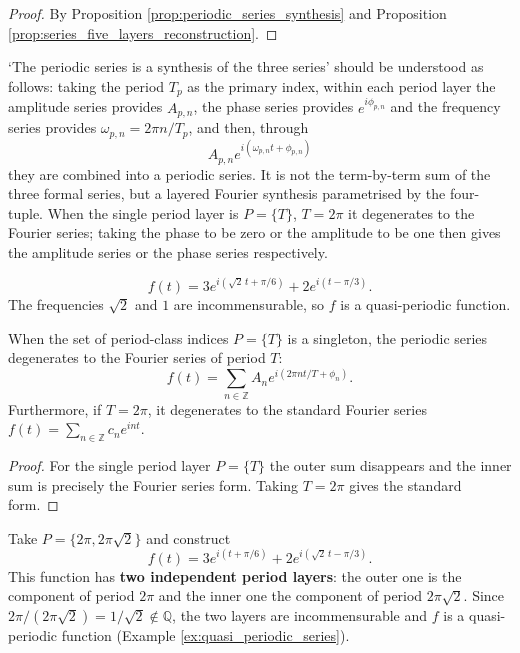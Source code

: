 \begin{proof}
By Proposition \ref{prop:periodic_series_synthesis} and Proposition \ref{prop:series_five_layers_reconstruction}.
\end{proof}

\begin{remark}\label{rem:periodic_series_synthesis_scope}
`The periodic series is a synthesis of the three series' should be understood as follows: taking the period $T_p$ as the primary index, within each period layer the amplitude series provides $A_{p,n}$, the phase series provides $e^{i\phi_{p,n}}$ and the frequency series provides $\omega_{p,n}=2\pi n/T_p$, and then, through
\[
A_{p,n}e^{i(\omega_{p,n}t+\phi_{p,n})}
\]
they are combined into a periodic series. It is not the term-by-term sum of the three formal series, but a layered Fourier synthesis parametrised by the four-tuple. When the single period layer is $P=\{T\}$, $T=2\pi$ it degenerates to the Fourier series; taking the phase to be zero or the amplitude to be one then gives the amplitude series or the phase series respectively.
\end{remark}

\begin{example}\label{ex:quasi_periodic_series}
\[
f(t) = 3 e^{i(\sqrt{2}\,t + \pi/6)} + 2 e^{i(t - \pi/3)}.
\]
The frequencies $\sqrt{2}$ and $1$ are incommensurable, so $f$ is a quasi-periodic function.
\end{example}

\begin{property}\label{prop:periodic_series_degeneration}
When the set of period-class indices $P = \{T\}$ is a singleton, the periodic series degenerates to the Fourier series of period $T$:
\[
f(t) = \sum_{n \in \mathbb{Z}} A_n e^{i(2\pi n t / T + \phi_n)}.
\]
Furthermore, if $T = 2\pi$, it degenerates to the standard Fourier series $f(t) = \sum_{n \in \mathbb{Z}} c_n e^{int}$.
\end{property}

\begin{proof}
For the single period layer $P = \{T\}$ the outer sum disappears and the inner sum is precisely the Fourier series form. Taking $T = 2\pi$ gives the standard form.
\end{proof}

\begin{example}\label{ex:two_period_layers}
Take $P = \{2\pi, 2\pi\sqrt{2}\}$ and construct
\[
f(t) = 3 e^{i(t + \pi/6)} + 2 e^{i(\sqrt{2}\,t - \pi/3)}.
\]
This function has \textbf{two independent period layers}: the outer one is the component of period $2\pi$ and the inner one the component of period $2\pi\sqrt{2}$. Since $2\pi/(2\pi\sqrt{2}) = 1/\sqrt{2} \notin \mathbb{Q}$, the two layers are incommensurable and $f$ is a quasi-periodic function (Example \ref{ex:quasi_periodic_series}).
\end{example}

